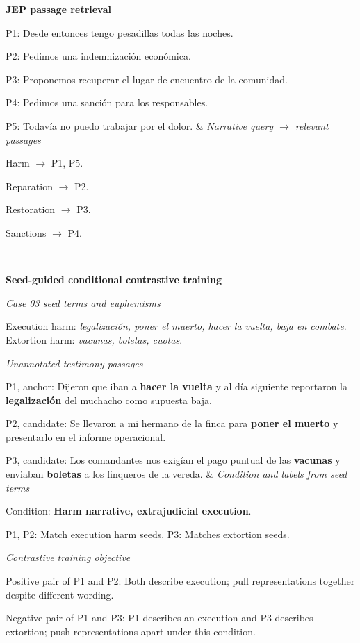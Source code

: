 \documentclass{article}
\begin{document}
\begin{longtable}
\textbf{JEP passage retrieval}~\cite{JEPCaso03}\par
P1: Desde entonces tengo pesadillas todas las noches.\par
P2: Pedimos una indemnización económica.\par
P3: Proponemos recuperar el lugar de encuentro de la comunidad.\par
P4: Pedimos una sanción para los responsables.\par
P5: Todavía no puedo trabajar por el dolor.
&
\textit{Narrative query \(\rightarrow\) relevant passages}\par
Harm \(\rightarrow\) P1, P5.\par
Reparation \(\rightarrow\) P2.\par
Restoration \(\rightarrow\) P3.\par
Sanctions \(\rightarrow\) P4.\par
\\
\midrule

\textbf{Seed-guided conditional contrastive training}~\cite{XClass}\par
\textit{Case 03 seed terms and euphemisms}\par
Execution harm: \emph{legalización, poner el muerto, hacer la vuelta, baja en combate}.\newline
Extortion harm: \emph{vacunas, boletas, cuotas}.\par\smallskip
\textit{Unannotated testimony passages}\par
P1, anchor: Dijeron que iban a \textbf{hacer la vuelta} y al día siguiente reportaron la \textbf{legalización} del muchacho como supuesta baja.\par
P2, candidate: Se llevaron a mi hermano de la finca para \textbf{poner el muerto} y presentarlo en el informe operacional.\par
P3, candidate: Los comandantes nos exigían el pago puntual de las \textbf{vacunas} y enviaban \textbf{boletas} a los finqueros de la vereda.
&
\textit{Condition and labels from seed terms}\par
Condition: \textbf{Harm narrative, extrajudicial execution}.\par\smallskip
P1, P2: Match execution harm seeds.\newline
P3: Matches extortion seeds.\par\smallskip
\textit{Contrastive training objective}\par
Positive pair of P1 and P2: Both describe execution; pull representations together despite different wording.\par\smallskip
Negative pair of P1 and P3: P1 describes an execution and P3 describes extortion; push representations apart under this condition.
\\
\end{longtable}
\endgroup
\end{document}
